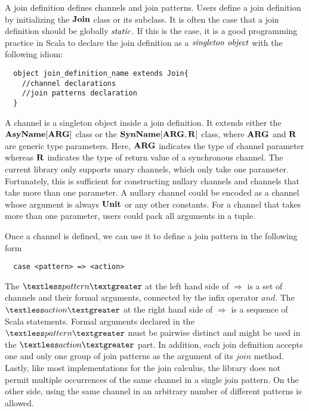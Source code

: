 A join definition defines channels and join patterns.  Users define a join definition by initializing the $\bf{Join}$ class or its subclass.  It is often the case that a join definition should be globally $\it{static}$.  If this is the case, it is a good programming practice in Scala to declare the join definition as a $\it{singleton\ object}$ with the following idiom:

\begin{lstlisting}
  object join_definition_name extends Join{
    //channel declarations
    //join patterns declaration
  }
\end{lstlisting}

A channel is a singleton object inside a join definition.  It extends either the $\bf{AsyName[ARG]}$ class or the $\bf{SynName[ARG,R]}$ class, where $\bf{ARG}$ and $\bf{R}$ are generic type parameters.  Here, $\bf{ARG}$ indicates the type of channel parameter whereas $\bf{R}$ indicates the type of return value of a synchronous channel.  The current library only supports unary channels, which only take one parameter.  Fortunately, this is sufficient for constructing nullary channels and channels that take more than one parameter.  A nullary channel could be encoded as a channel whose argument is always $\bf{Unit}$ or any other constants.  For a channel that takes more than one parameter, users could pack all arguments in a tuple.

Once a channel is defined, we can use it to define a join pattern in the following form
\begin{lstlisting}
  case <pattern> => <action>
\end{lstlisting}

\newpage

The $\textless pattern \textgreater$ at the left hand side of $\Rightarrow$ is a set of channels and their formal arguments, connected by the infix operator $and$.  The  $\textless action \textgreater$ at the right hand side of $\Rightarrow$ is a sequence of Scala statements.  Formal arguments declared in the  $\textless pattern \textgreater$ must be pairwise distinct and might be used in the  $\textless action \textgreater$ part.  In addition, each join definition accepts one and only one group of join patterns as the argument of its $join$ method.  Lastly, like most implementations for the join calculus, the library does not permit multiple occurrences of the same channel in a single join pattern.  On the other side, using the same channel in an arbitrary number of different patterns is allowed.

